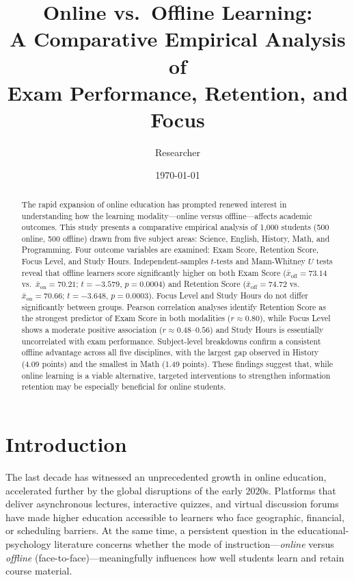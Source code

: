 \documentclass[11pt]{article}
\title{Online vs.\ Offline Learning: \\
       A Comparative Empirical Analysis of \\
       Exam Performance, Retention, and Focus}
\author{Researcher}
\date{\today}
\begin{document}
\maketitle

\begin{abstract}
The rapid expansion of online education has prompted renewed interest in understanding how the
learning modality---online versus offline---affects academic outcomes.
This study presents a comparative empirical analysis of 1,000 students
(500 online, 500 offline) drawn from five subject areas: Science, English, History, Math,
and Programming.
Four outcome variables are examined: Exam Score, Retention Score, Focus Level, and
Study Hours.
Independent-samples $t$-tests and Mann-Whitney $U$ tests reveal that offline learners
score significantly higher on both Exam Score ($\bar{x}_{\text{off}} = 73.14$
vs.\ $\bar{x}_{\text{on}} = 70.21$; $t = -3.579$, $p = 0.0004$) and
Retention Score ($\bar{x}_{\text{off}} = 74.72$ vs.\ $\bar{x}_{\text{on}} = 70.66$;
$t = -3.648$, $p = 0.0003$).
Focus Level and Study Hours do not differ significantly between groups.
Pearson correlation analyses identify Retention Score as the strongest predictor of
Exam Score in both modalities ($r \approx 0.80$), while Focus Level shows a moderate
positive association ($r \approx 0.48$--$0.56$) and Study Hours is essentially
uncorrelated with exam performance.
Subject-level breakdowns confirm a consistent offline advantage across all five
disciplines, with the largest gap observed in History (4.09 points) and the smallest
in Math (1.49 points).
These findings suggest that, while online learning is a viable alternative,
targeted interventions to strengthen information retention may be especially
beneficial for online students.
\end{abstract}

\section{Introduction}

The last decade has witnessed an unprecedented growth in online education, accelerated
further by the global disruptions of the early 2020s.
Platforms that deliver asynchronous lectures, interactive quizzes, and virtual
discussion forums have made higher education accessible to learners who face geographic,
financial, or scheduling barriers.
At the same time, a persistent question in the educational-psychology literature
concerns whether the mode of instruction---\textit{online} versus
\textit{offline} (face-to-face)---meaningfully influences how well students
learn and retain course material.
\end{document}
